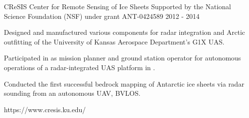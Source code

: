 \begin{cventries}
\cvprojwideentry
  	{CReSIS} %
  	{Center for Remote Sensing of Ice Sheets} %
    {Supported by the National Science Foundation (NSF) under grant ANT-0424589} %
    {2012 - 2014} %
    {
      \begin{cvitems} %
        \item {Designed and manufactured various components for radar integration and Arctic outfitting of the University of Kansas Aerospace Department's G1X UAS.}
        \item {Participated in  as mission planner and ground station operator for autonomous operations of a radar-integrated UAS platform in .}
        \item {Conducted the first successful bedrock mapping of Antarctic ice sheets via radar sounding from an autonomous UAV, BVLOS.}
      \end{cvitems}
    } %
    {https://www.cresis.ku.edu/} %
    {\showprojectdescriptions}
    {}
    
\end{cventries}
